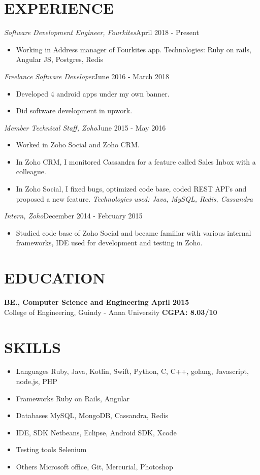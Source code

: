 \documentclass[11pt,a4paper]{article}
\begin{document}
\section*{EXPERIENCE}
\emph{Software Development Engineer, Fourkites}{\hfill April 2018 - Present}
\begin{itemize}[noitemsep]
\item Working in Address manager of Fourkites app. Technologies: Ruby on rails, Angular JS, Postgres, Redis
\end{itemize}
\emph{Freelance Software Developer}{\hfill June 2016 -  March 2018}
\begin{itemize}[noitemsep]
\item Developed 4 android apps under my own banner.
\item Did software development in upwork.
\end{itemize}
\emph{Member Technical Staff, Zoho}{\hfill June 2015 - May 2016}
\begin{itemize}[noitemsep]
\item Worked in Zoho Social and Zoho CRM.
\item In Zoho CRM, I monitored Cassandra for a feature called Sales Inbox with a colleague.
\item In Zoho Social, I fixed bugs, optimized code base, coded REST API's and proposed a new feature. \emph {Technologies used: Java, MySQL, Redis, Cassandra}
\end{itemize}
\emph{Intern, Zoho}{\hfill December 2014 - February 2015}
\begin{itemize}[noitemsep]
\item Studied code base of Zoho Social and became familiar with various internal frameworks, IDE used for development and testing in Zoho.
\end{itemize}
\section*{EDUCATION}
\textbf{BE., Computer Science and Engineering {\hfill April 2015}}\\
College of Engineering, Guindy - Anna University {\hfill \textbf{CGPA: 8.03/10}}\\
\section*{SKILLS}
\TabPositions{3cm}
\begin{itemize}[noitemsep]
\item Languages \tab Ruby, Java, Kotlin, Swift, Python, C, C++, golang, Javascript, node.js, PHP
\item Frameworks \tab Ruby on Rails, Angular
\item Databases \tab MySQL, MongoDB, Cassandra, Redis
\item IDE, SDK \tab Netbeans, Eclipse, Android SDK, Xcode
\item Testing tools \tab Selenium
\item Others \tab Microsoft office, Git, Mercurial, Photoshop
\end{itemize}
\end{document}
